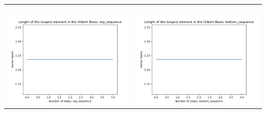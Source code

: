 \documentclass[10pt]{article}
\begin{document}
\begin{tabular}{c|c}
\begin{minipage}{.45\textwidth}
\end{minipage} \\ \\
\hline \\\begin{minipage}{.45\textwidth}
\includegraphics[width=\textwidth]{"DATA/5d/5 generators 1 bound G/top_sequence LENGTH"}
\end{minipage} &
\begin{minipage}{.45\textwidth}
\includegraphics[width=\textwidth]{"DATA/5d/5 generators 1 bound G bottomup/bottom_sequence LENGTH"}
\end{minipage}
\end{tabular}
\end{document}
